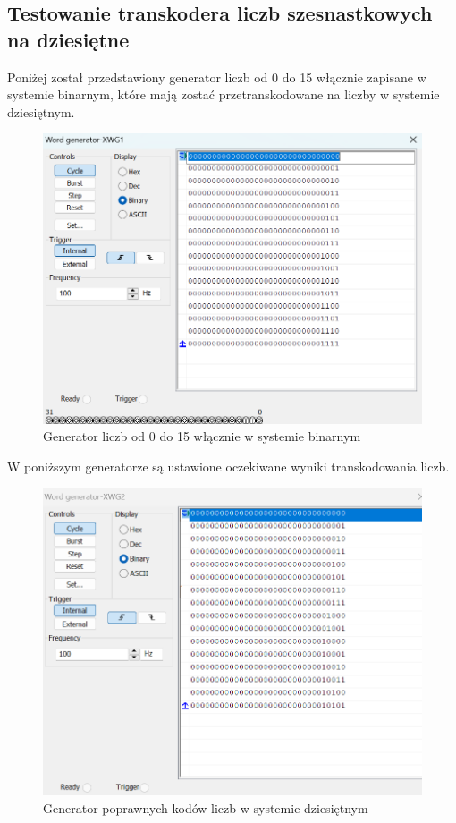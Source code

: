 \documentclass{article}
\begin{document}
    \subsection{Testowanie transkodera liczb szesnastkowych na dziesiętne}
    Poniżej został przedstawiony generator liczb od 0 do 15 włącznie zapisane w systemie binarnym,
    które mają zostać przetranskodowane na liczby w systemie dziesiętnym.
    \begin{figure}[H]
        \centering
        \captionsetup{font=small, skip=2pt}
        \includegraphics[scale=0.7]{images/generator1}
        \caption{Generator liczb od 0 do 15 włącznie w systemie binarnym}
    \end{figure}
    
    W poniższym generatorze są ustawione oczekiwane wyniki transkodowania liczb.
    \begin{figure}[H]
        \centering
        \captionsetup{font=small, skip=2pt}
        \includegraphics[scale=0.7]{images/generator2}
        \caption{Generator poprawnych kodów liczb w systemie dziesiętnym}
    \end{figure}
\end{document}
